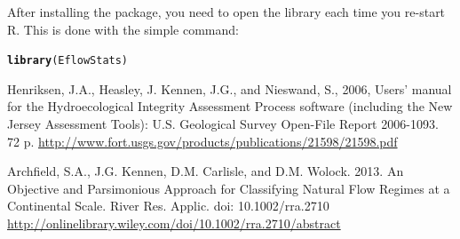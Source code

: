 \documentclass[a4paper,11pt]{article}\usepackage[]{graphicx}\usepackage[]{color}
\makeatletter
\newcommand{\hlstd}[1]{\textcolor[rgb]{0.345,0.345,0.345}{#1}}%
\newcommand{\hlkwd}[1]{\textcolor[rgb]{0.737,0.353,0.396}{\textbf{#1}}}%
\newenvironment{kframe}{%
 \def\at@end@of@kframe{}%
 \ifinner\ifhmode%
  \def\at@end@of@kframe{\end{minipage}}%
  \begin{minipage}{\columnwidth}%
 \fi\fi%
 \def\FrameCommand##1{\hskip\@totalleftmargin \hskip-\fboxsep
 \colorbox{shadecolor}{##1}\hskip-\fboxsep
     \hskip-\linewidth \hskip-\@totalleftmargin \hskip\columnwidth}%
 \MakeFramed {\advance\hsize-\width
   \@totalleftmargin\z@ \linewidth\hsize
   \@setminipage}}%
 {\par\unskip\endMakeFramed%
 \at@end@of@kframe}
\newenvironment{knitrout}{}{} %
\makeatother
\begin{document}
After installing the package, you need to open the library each time you re-start R.  This is done with the simple command:
\begin{knitrout}
\color{fgcolor}\begin{kframe}
\begin{alltt}
\hlkwd{library}\hlstd{(EflowStats)}
\end{alltt}
\end{kframe}
\end{knitrout}


\clearpage

\begin{thebibliography}{10}

Henriksen, J.A., Heasley, J. Kennen, J.G., and Nieswand, S., 2006, Users' manual for the Hydroecological Integrity Assessment Process software (including the New Jersey Assessment Tools): U.S. Geological Survey Open-File Report 2006-1093. 72 p.
\url{http://www.fort.usgs.gov/products/publications/21598/21598.pdf}

Archfield, S.A., J.G. Kennen, D.M. Carlisle, and D.M. Wolock. 2013. An Objective and Parsimonious Approach for Classifying Natural Flow Regimes at a Continental Scale. River Res. Applic. doi: 10.1002/rra.2710
\url{http://onlinelibrary.wiley.com/doi/10.1002/rra.2710/abstract}

\end{thebibliography}
\end{document}
